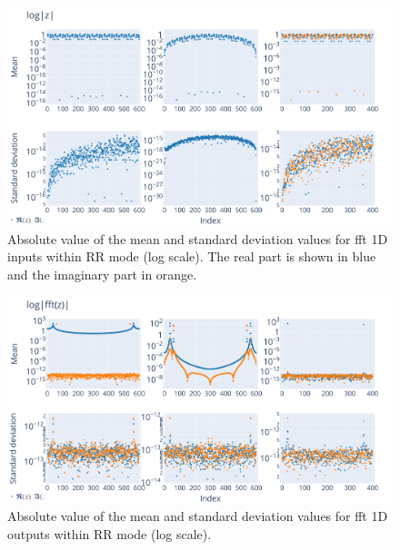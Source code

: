\documentclass[10pt,journal,compsoc]{IEEEtran}
\begin{document}
\begin{figure}
    \centering
    \includegraphics[width=\linewidth]{figure/FFT/fft_x.png}
    \caption{Absolute value of the mean and standard deviation values for fft 1D
        inputs within RR mode (log scale). The real part is shown in blue and
        the imaginary part in orange.}
    \label{fig:fft1D_inputs}
\end{figure}

\begin{figure}
    \centering
    \includegraphics[width=\linewidth]{figure/FFT/fft_y.png}
    \caption{Absolute value of the mean and standard deviation values
        for fft 1D outputs within RR mode (log scale).}
    \label{fig:fft1D_outputs}
\end{figure}
\end{document}
